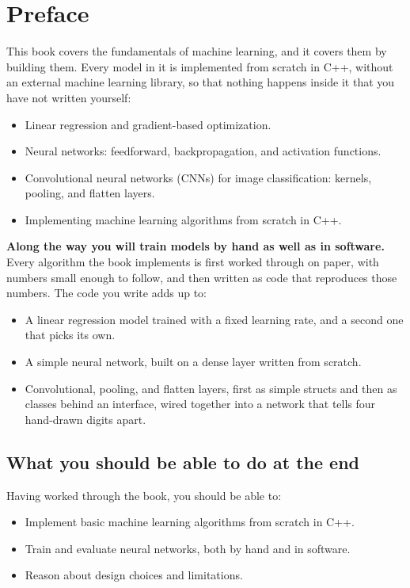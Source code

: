 
\chapter{Preface}

This book covers the fundamentals of machine learning, and it covers them by building them. Every
model in it is implemented from scratch in C++, without an external machine learning library, so
that nothing happens inside it that you have not written yourself:
\begin{itemize}
  \item Linear regression and gradient-based optimization.
  \item Neural networks: feedforward, backpropagation, and activation functions.
  \item Convolutional neural networks (CNNs) for image classification: kernels, pooling, and
    flatten layers.
  \item Implementing machine learning algorithms from scratch in C++.
\end{itemize}

\textbf{Along the way you will train models by hand as well as in software.} Every algorithm the
book implements is first worked through on paper, with numbers small enough to follow, and then
written as code that reproduces those numbers. The code you write adds up to:
\begin{itemize}
  \item A linear regression model trained with a fixed learning rate, and a second one that picks
    its own.
  \item A simple neural network, built on a dense layer written from scratch.
  \item Convolutional, pooling, and flatten layers, first as simple structs and then as classes
    behind an interface, wired together into a network that tells four hand-drawn digits apart.
\end{itemize}

\section*{What you should be able to do at the end}
Having worked through the book, you should be able to:
\begin{itemize}
  \item Implement basic machine learning algorithms from scratch in C++.
  \item Train and evaluate neural networks, both by hand and in software.
  \item Reason about design choices and limitations.
\end{itemize}

